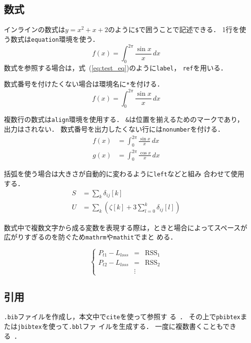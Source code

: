 \subsection{数式}

インラインの数式は$y=x^2+x+2$のように\texttt{\$}で囲うことで記述できる．
1行を使う数式は\texttt{equation}環境を使う．
\begin{equation}
 f(x) = \int_0^{2\pi}\frac{\sin x}{x}\,dx
  \label{eq:test_eq}
\end{equation}
数式を参照する場合は，式~(\ref{eq:test_eq})のように\texttt{\yen label}，
\texttt{\yen ref}を用いる．

数式番号を付けたくない場合は環境名に\texttt{*}を付ける．
\begin{equation*}
 f(x) = \int_0^{2\pi}\frac{\sin x}{x}\,dx
\end{equation*}


複数行の数式は\texttt{align}環境を使用する．
\texttt{\&}は位置を揃えるためのマークであり，出力はされない．
数式番号を出力したくない行には\texttt{\yen nonumber}を付ける．
\begin{align}
 f(x) &= \int_0^{2\pi}\frac{\sin x}{x}\,dx \nonumber\\
 g(x) &= \int_0^{2\pi}\frac{\cos x}{x}\,dx
\end{align}

括弧を使う場合は大きさが自動的に変わるように\texttt{\yen left}などと組み
合わせて使用する．
\begin{align*}
 S &= \sum_k \delta_{ij}[k] \\
 U &= \sum_k \left( \zeta[k] + 3\sum_{l=0}^k \delta_{ij}[l] \right)
\end{align*}

数式中で複数文字から成る変数を表現する際は，ときと場合によってスペースが
広がりすぎるのを防ぐため\texttt{\yen mathrm}や\texttt{\yen mathit}でまと
める．

\begin{equation*}
 \left\{
 \begin{array}{rcl}
  P_{t1} - L_\mathit{loss} &=& \mathrm{RSS}_1\\
  P_{t2} - L_\mathit{loss} &=& \mathrm{RSS}_2\\
  &\vdots&
 \end{array}
 \right.
\end{equation*}

\subsection{引用}

\texttt{.bib}ファイルを作成し，本文中で\texttt{\yen cite}を使って参照す
る~\cite{wu13:will_pds}．
その上で\texttt{pbibtex}または\texttt{jbibtex}を使って\texttt{.bbl}ファ
イルを生成する．
一度に複数書くこともでき
る~\cite{scholten08:cmc_psp,nakauchi05:intelli_kitchen%
,yang12:locate_finger}．


